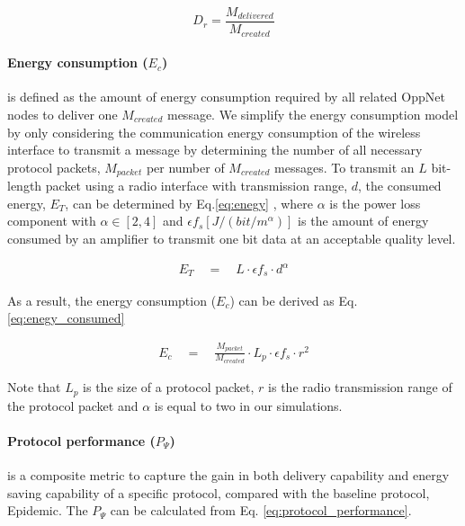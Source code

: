 	\begin{equation}
	\label{delivery_ratio}
	D_{r} =\frac { { M }_{ delivered } }{ { M }_{ created } } 
	\end{equation}

\paragraph{Energy consumption ($E_{c}$)} 
is defined as the amount of energy consumption required by all related OppNet nodes to deliver one $M_{created}$ message.
%
We simplify the energy consumption model by only considering the communication energy consumption of the wireless interface to transmit a message by determining the number of all necessary protocol packets, $M_{packet}$ per number of $M_{created}$ messages.
To transmit an $L$ bit-length packet using a radio interface with transmission range, $d$, the consumed energy, ${ E }_{ T }$, can be determined by Eq.\ref{eq:enegy} \cite{Yang2010, Wang2006}, where $\alpha$ is the power loss component with $\alpha \in \left[ 2,4 \right]$ and $\epsilon { f }_{ s }\left[ J/(bit/{ m }^{ \alpha  }) \right]$ is the amount of energy consumed by an amplifier to transmit one bit data at an acceptable quality level.

\begin{eqnarray}
	\label{eq:enegy}
	{ E }_{ T }\quad =\quad L\cdot  { \epsilon  }{ f_s } \cdot  { d }^{ \alpha  }
\end{eqnarray} 

As a result, the energy consumption ($E_c$) can be derived as Eq. \ref{eq:enegy_consumed} 

\begin{eqnarray}
	\label{eq:enegy_consumed}
	{ E }_{ c }\quad =\quad \frac{M_{packet}}{M_{created}} \cdot L_p \cdot  { \epsilon  }{ f_s } \cdot  { r }^{ 2 }
\end{eqnarray} 

Note that $L_p$ is the size of a protocol packet, $r$ is the radio transmission range of the protocol packet and $\alpha$ is equal to two in our simulations.
\paragraph{Protocol performance ($P_{\Psi}$)} is a composite metric to capture the gain in both delivery capability and energy saving capability of a specific protocol, compared with the baseline protocol, Epidemic.
The $P_{\Psi}$ can be calculated from Eq. \ref{eq:protocol_performance}.

